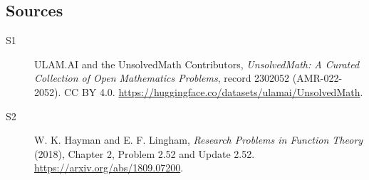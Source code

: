 \documentclass[11pt]{article}
\begin{document}
\subsection{Sources}
\begin{description}
\item[\hypertarget{source:2302052:1}{S1}] ULAM.AI and the UnsolvedMath Contributors, \emph{UnsolvedMath: A Curated Collection of Open Mathematics Problems}, record 2302052 (AMR-022-2052). CC BY 4.0. \url{https://huggingface.co/datasets/ulamai/UnsolvedMath}.
\item[\hypertarget{source:2302052:2}{S2}] W. K. Hayman and E. F. Lingham, \emph{Research Problems in Function Theory} (2018), Chapter 2, Problem 2.52 and Update 2.52. \url{https://arxiv.org/abs/1809.07200}.
\end{description}
\label{end:2302052}
\end{document}
